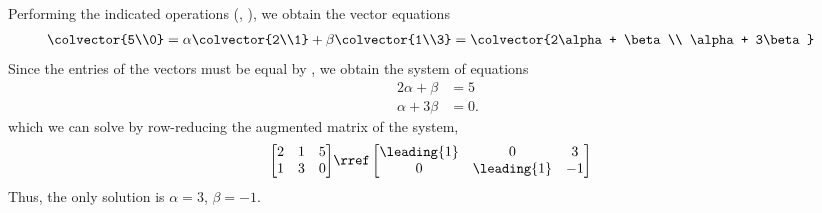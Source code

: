 Performing the indicated operations (, ), we obtain the vector equations
\begin{align*}
\colvector{5\\0}
&= \alpha\colvector{2\\1} + \beta\colvector{1\\3} 
= \colvector{2\alpha + \beta \\ \alpha + 3\beta}
\end{align*}
Since the entries of the vectors must be equal by , we obtain the system of equations
\begin{align*}
2\alpha + \beta &= 5\\
\alpha + 3\beta &= 0.
\end{align*}
which we can solve by row-reducing the augmented matrix of the system,
\begin{align*}
\begin{bmatrix}
2 & 1 & 5\\ 
1 & 3 & 0
\end{bmatrix}
&\rref
\begin{bmatrix}
\leading{1} & 0 & 3\\
0 & \leading{1} & -1
\end{bmatrix}
\end{align*}
Thus, the only solution is $\alpha = 3$, $\beta = -1$.
